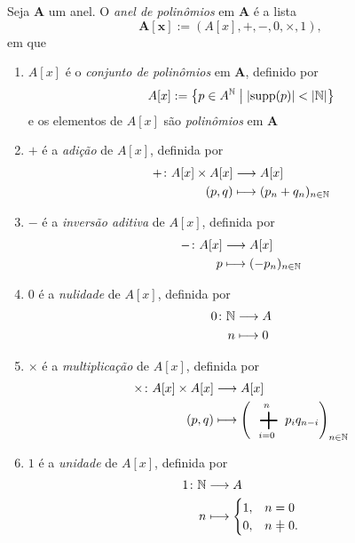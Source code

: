\begin{definition}
	Seja $\bm A$ um anel. O \emph{anel de polinômios} em $\bm A$ é a lista
	\begin{equation*}
	\bm{A[x]} := (A[x],+,-,0,\times,1),
	\end{equation*}
em que
\begin{enumerate}
	\item $A[x]$ é o \emph{conjunto de polinômios} em $\bm A$, definido por
		\begin{equation*}
		A[x] := \left\{{p \in A^{\mathbb{N}}}\;\middle\vert\;{\left\lvert{\operatorname{supp}(p)}\right\rvert < \left\lvert{\mathbb{N}}\right\rvert}\right\}
		\end{equation*}
	e os elementos de $A[x]$ são \emph{polinômios} em $\bm A$
	\item $+$ é a \emph{adição} de $A[x]$, definida por
		\begin{align*}
		{+}\colon {A[x] \times A[x]} &\longrightarrow {A[x]} \\{(p,q)} &\longmapsto (p_n+q_n)_{n \in \mathbb{N}}
		\end{align*}
	\item $-$ é a \emph{inversão aditiva} de $A[x]$, definida por
		\begin{align*}
		{-}\colon {A[x]} &\longrightarrow {A[x]} \\{p} &\longmapsto (-p_n)_{n \in \mathbb{N}}
		\end{align*}
	\item $0$ é a \emph{nulidade} de $A[x]$, definida por
		\begin{align*}
		\func{0}{\N}{A}{n}{0}
		\end{align*}
	\item $\times$ é a \emph{multiplicação} de $A[x]$, definida por
		\begin{align*}
		\func{\times}{A[x] \times A[x]}{A[x]}{(p,q)}{\left(\sum_{i=0}^n p_i q_{n-i}\right)_{n \in \N}}
		\end{align*}
	\item $1$ é a \emph{unidade} de $A[x]$, definida por
		\begin{align*}
		\func{1}{\N}{A}{n}{
			\begin{cases}
			1,& n=0 \\
			0,& n\neq0.
		\end{cases}}
		\end{align*}
\end{enumerate}
\end{definition}

